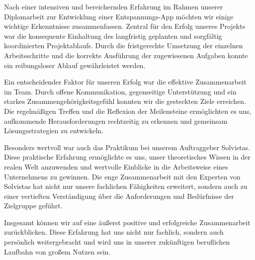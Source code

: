 
Nach einer intensiven und bereichernden Erfahrung im Rahmen unserer Diplomarbeit zur Entwicklung einer Entspannungs-App 
möchten wir einige wichtige Erkenntnisse zusammenfassen. Zentral für den Erfolg unseres Projekts war die konsequente 
Einhaltung des langfristig geplanten und sorgfältig koordinierten Projektablaufs. Durch die fristgerechte Umsetzung 
der einzelnen Arbeitsschritte und die korrekte Ausführung der zugewiesenen Aufgaben konnte ein reibungsloser Ablauf 
gewährleistet werden.

Ein entscheidender Faktor für unseren Erfolg war die effektive Zusammenarbeit im Team. Durch offene Kommunikation, 
gegenseitige Unterstützung und ein starkes Zusammengehörigkeitsgefühl konnten wir die gesteckten Ziele erreichen. 
Die regelmäßigen Treffen und die Reflexion der Meilensteine ermöglichten es uns, aufkommende 
Herausforderungen rechtzeitig zu erkennen und gemeinsam Lösungsstrategien zu entwickeln.

Besonders wertvoll war auch das Praktikum bei unserem Auftraggeber Solvistas. Diese praktische Erfahrung ermöglichte 
es uns, unser theoretisches Wissen in der realen Welt anzuwenden und wertvolle Einblicke in die Arbeitsweise eines 
Unternehmens zu gewinnen. Die enge Zusammenarbeit mit den Experten von Solvistas hat nicht nur unsere fachlichen 
Fähigkeiten erweitert, sondern auch zu einer vertieften Verständigung über die Anforderungen und Bedürfnisse 
der Zielgruppe geführt.

Insgesamt können wir auf eine äußerst positive und erfolgreiche Zusammenarbeit zurückblicken. 
Diese Erfahrung hat uns nicht nur fachlich, sondern auch persönlich weitergebracht 
und wird uns in unserer zukünftigen beruflichen Laufbahn von großem Nutzen sein.
